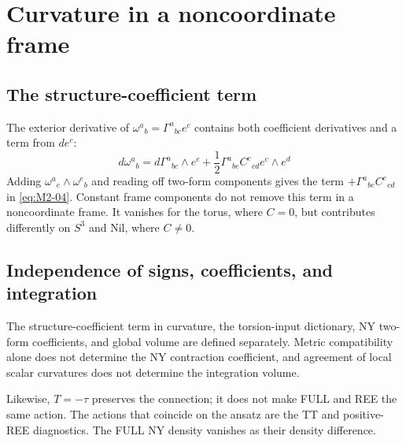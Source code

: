 \section{Curvature in a noncoordinate frame}\label{appG}
\subsection{The structure-coefficient term}
The exterior derivative of $\omega^a{}_b=\Gamma^a{}_{bc}e^c$
contains both coefficient derivatives and a term from $de^c$:
\begin{equation}
d\omega^a{}_b
=d\Gamma^a{}_{bc}\wedge e^c
+\frac12\Gamma^a{}_{be}C^e{}_{cd}e^c\wedge e^d
\tag{G-01}\label{eq:G-01}
\end{equation}
Adding $\omega^a{}_e\wedge\omega^e{}_b$ and reading off two-form
components gives the term $+\Gamma^a{}_{be}C^e{}_{cd}$ in
\eqref{eq:M2-04}.
Constant frame components do not remove this term in a noncoordinate frame.
It vanishes for the torus, where $C=0$, but contributes differently on
$S^3$ and Nil, where $C\ne0$.

\subsection{Independence of signs, coefficients, and integration}
The structure-coefficient term in curvature, the torsion-input dictionary,
NY two-form coefficients, and global volume are defined separately.
Metric compatibility alone does not determine the NY contraction
coefficient, and agreement of local scalar curvatures does not
determine the integration volume.

Likewise, $T=-\tau$ preserves the connection; it does not make FULL
and REE the same action.
The actions that coincide on the ansatz are the TT and positive-REE
diagnostics. The FULL NY density vanishes as their density difference.
